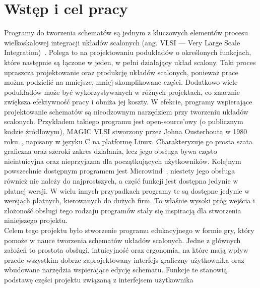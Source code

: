 \chapter{Wstęp i cel pracy}

Programy do tworzenia schematów są jednym z kluczowych elementów
procesu wielkoskalowej integracji układów scalonych (ang. VLSI — Very Large Scale Integration)~\cite{VLSI_insemi}.
Polega to na projektowaniu podukładów o określonych funkcjach,
które następnie są łączone w jeden, w pełni działający układ scalony.
Taki proces upraszcza projektowanie oraz produkcję układów scalonych, ponieważ prace można podzielić na mniejsze,
mniej skomplikowane części.
Dodatkowo wiele podukładów może być wykorzystywanych w różnych projektach,
co znacznie zwiększa efektywność pracy i obniża jej koszty.
W efekcie,
programy wspierające projektowanie schematów są nieodzownym narzędziem przy tworzeniu układów scalonych.
Przykładem takiego programu jest open-source'owy (o publicznym kodzie źródłowym),
MAGIC VLSI stworzony przez Johna Ousterhouta w 1980 roku~\cite{MAGIC},
napisany w języku C na platformę Linux\cite{MAGIC_wiki}.
Charakteryzuje go prosta szata graficzna oraz szeroki zakres działania,
lecz jego obsługa bywa często nieintuicyjna oraz nieprzyjazna dla początkujących użytkowników.
Kolejnym powszechnie dostępnym programem jest Microwind~\cite{Microwind},
niestety jego obsługa również nie należy do najprostszych, a część funkcji jest dostępna jedynie w płatnej wersji.
W wielu innych przypadkach programy te są dostępne jedynie w wersjach płatnych, kierowanych do dużych firm.
To właśnie wysoki próg wejścia
i złożoność obsługi tego rodzaju programów stały się inspiracją dla stworzenia niniejszego projektu.\\
\indent Celem tego projektu było stworzenie
programu edukacyjnego w formie gry, który pomoże w nauce tworzenia schematów układów scalonych.
Jedne z głównych założeń to prostota obsługi, intuicyjność oraz ergonomia,
na które mają wpływ przede wszystkim dobrze zaprojektowany interfejs graficzny użytkownika
oraz wbudowane narzędzia wspierające edycję schematu.
Funkcje te stanowią podstawę części projektu związaną z interfejsem użytkownika
